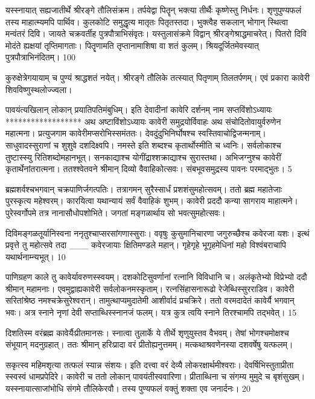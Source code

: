 यस्स्नायात् सह्यजातीर्थे श्रीरङ्गे तौलिसंक्रम।
तर्पयेद्वा पितॄन् भक्त्या तीर्थैः कृष्णेस्तु निर्धनः।
शृणुपुण्यफलं तस्य माहात्म्यमपि पार्थिव।
कुलकोटि समुद्धृत्य मातृतः पितृतस्तदा।
भुक्त्वैह सकलान् भोगान् स्थित्वा मन्वंतरं दिवि।
जायते चक्रवर्तीह पुत्रपौत्राभिसंवृतः।
यस्तुलासंक्रमे विद्वान् श्रीरङ्गेश्राद्धमाचरेत्।
पितरो दिवि मोदंते ह्यक्षयां तृप्तिमागताः।
पितॄणामति तृप्तानामाशिषा वा शतं कुलम्।
श्रियदूर्जितमेवस्यात् पुत्रपौत्राभिनंदितम्।
100

कुरुक्षेत्रेगयायाम् च पुण्यं श्राद्धशतं नयेत्।
श्रीरङ्गे तौलिके तत्स्यात् पितृणाम् तिलतर्पणम्।
एवं प्रकारा कावेरी शिवविष्णुस्थलोज्ज्वला।

पावयंत्यखिलान् लोकान् प्रयातिपतिमंबुधिम्।
इति देवादीनां कावेरि दर्शनम् नाम सप्तविंशोऽध्यायः
******************
अथ अष्टाविंशोऽध्यायः
कावेरी समुद्रयोर्विवाहः अथ संचोदितोवायुर्वरुणेन महात्मना।
प्रत्युजगाम कावेरीमप्सरोभिस्समंततः।
देवदुंदुभिनिर्घोषश्च स्वस्तिवाचोद्विजन्मनाम्।
साधुवादस्सुराणां च शुशुवे दशदिक्ष्वपि।
नमस्ते इति शब्दश्च कृतार्थोस्मीति च ध्वनिः।
सर्वलोकाश्च तुष्टास्स्यु रितिशब्दोमहानभूत्।
सनकाद्याश्च योगींद्राश्शक्राद्याश्च सुरास्तथा।
अभिजग्नुश्च कावेरीं कृतार्थेनांतरात्मना।
ततश्श्वेतवने श्रीमान् दिव्यो वैवाहिकोत्सवः।
संबभूवसमुद्रस्य पावनः परमाद्भुतः।
5

ब्रह्मशर्वश्चभगवान् चक्रपाणिर्जगत्पतिः।
तत्रागमन् सुरैस्सार्धं प्रशशंसुमहोत्सवम्।
ततो ब्रह्म महातेजाः पुरस्कृत्य महेश्वरम्।
कारयित्वा यथान्यायं सर्वं वैवाहिकं शुभम्।
कावेरी प्रददौ कन्या सागराय माहात्मने।
पुरेस्वर्गोपमे तत्र नानासौधोपशोभिते।
जगतां मङ्गळार्थाय सो भवत्सुमहोत्सवः।

दिविमङ्गळतूर्यानिस्वना ननृतुश्चाप्सरसांगणास्सुराः।
ववृषुः कुसुमानिचारणा जगुरुच्छैश्च कवेरजा यशः।
इत्थं प्रवृत्ते तु महोत्सवे तदा
___ कवेरजायाः क्षितिमण्डले महान्।
गृहेगृहे भूगृहमेधिनां महो
विश्वंबराचापि यथार्थनाम्न्यभूत्।
10

पाणिग्रहण काले तु कावेर्यावरुणस्स्वयम्।
दशकोटिसुवर्णानां रत्नानि विविधानि च।
अलंकृतेभ्यो विप्रेभ्यो ददौ श्रीमान् महामनाः।
एवमुद्वाह्यकावेरी सर्वलोकनमस्कृताम्।
रत्नसिंहासनारूढो रेजेब्धिस्सुरराडिव।
कावेरी सरितांश्रेष्ठ नमश्चक्रेसुरेश्वरान्।
तामुत्थाप्यमुदातेमी आशीर्वादं प्रचक्रिरे।
ततो वरमदादेतं कावेर्यै भगवान् भवः।
अत्र स्नाने नृणां देवी सप्ताब्धिस्स्नानजं फलम्।
यत्र कुत्र त्वयि स्नाने तिरश्चामपि तद्भवेत्।
15

दिशतिस्म वरंब्रह्म कावेर्यैःप्रीतमानसः।
स्नात्वा तुलार्के ये तीर्थे शृणुयुस्तव वैभवम्।
तेषां भोगश्चमोक्षश्च संभूयान् मदनुग्रहात्।
ततः श्रीमान् हरिःप्रादा वरं प्रीतोह्यनुत्तमम्।
मत्कथाश्रवणेनस्या दशवर्षेषु यत्फलम्।

सकृत्स्व महिमशृत्या तत्फलं स्यान्न संशयः।
इति दत्त्वा वरं देव्यै लोकरक्षार्थमीश्वराः।
देवर्षिभिस्तुताप्रीता स्स्वस्वं धामप्रपेदिरे।
कावेरी च ततो लोकान् पावयंतीस्ववारिणा।
प्रीताब्धिना च संगम्य मुमुदे च बृशंसुखम्।
यस्स्नायात्साजांभोधि संगमे तौलिकेरवौ।
तस्य पुण्यफलं वक्तुं शक्ता एव जनार्दनः।
20

